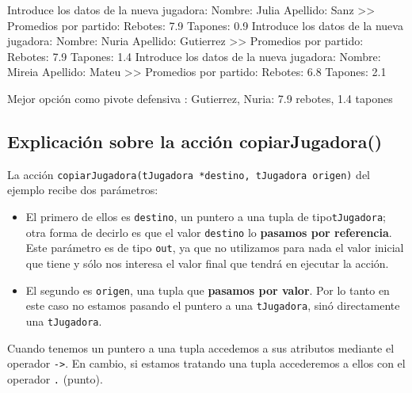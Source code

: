 \documentclass[
]{book}
\newenvironment{Shaded}{\begin{snugshade}}{\end{snugshade}}
\newcommand{\FloatTok}[1]{\textcolor[rgb]{0.00,0.00,0.81}{#1}}
\newcommand{\NormalTok}[1]{#1}
\providecommand{\tightlist}{%
  \setlength{\itemsep}{0pt}\setlength{\parskip}{0pt}}
\begin{document}
\begin{Shaded}
\begin{Highlighting}[]
\NormalTok{Introduce los datos de la nueva jugadora: }
\NormalTok{    Nombre: Julia}
\NormalTok{    Apellido: Sanz}
\NormalTok{    \textgreater{}\textgreater{} Promedios por partido:}
\NormalTok{    Rebotes: }\FloatTok{7.9}
\NormalTok{    Tapones: }\FloatTok{0.9}
\NormalTok{Introduce los datos de la nueva jugadora: }
\NormalTok{    Nombre: Nuria}
\NormalTok{    Apellido: Gutierrez}
\NormalTok{    \textgreater{}\textgreater{} Promedios por partido:}
\NormalTok{    Rebotes: }\FloatTok{7.9}
\NormalTok{    Tapones: }\FloatTok{1.4}
\NormalTok{Introduce los datos de la nueva jugadora: }
\NormalTok{    Nombre: Mireia}
\NormalTok{    Apellido: Mateu}
\NormalTok{    \textgreater{}\textgreater{} Promedios por partido:}
\NormalTok{    Rebotes: }\FloatTok{6.8}
\NormalTok{    Tapones: }\FloatTok{2.1}

\NormalTok{Mejor opción como pivote defensiva : }
\NormalTok{Gutierrez, Nuria: }\FloatTok{7.9}\NormalTok{ rebotes, }\FloatTok{1.4}\NormalTok{ tapones }
\end{Highlighting}
\end{Shaded}

\hypertarget{explicaciuxf3n-sobre-la-acciuxf3n-copiarjugadora}{%
\subsection{Explicación sobre la acción copiarJugadora()}\label{explicaciuxf3n-sobre-la-acciuxf3n-copiarjugadora}}

La acción \texttt{copiarJugadora(tJugadora\ *destino,\ tJugadora\ origen)} del ejemplo recibe dos parámetros:

\begin{itemize}
\tightlist
\item
  El primero de ellos es \texttt{destino}, un puntero a una tupla de tipo\texttt{tJugadora}; otra forma de decirlo es que el valor \texttt{destino} lo \textbf{pasamos por referencia}. Este parámetro es de tipo \texttt{out}, ya que no utilizamos para nada el valor inicial que tiene y sólo nos interesa el valor final que tendrá en ejecutar la acción.
\item
  El segundo es \texttt{origen}, una tupla que \textbf{pasamos por valor}. Por lo tanto en este caso no estamos pasando el puntero a una \texttt{tJugadora}, sinó directamente una \texttt{tJugadora}.
\end{itemize}

Cuando tenemos un puntero a una tupla accedemos a sus atributos mediante el operador \texttt{-\textgreater{}}. En cambio, si estamos tratando una tupla accederemos a ellos con el operador \texttt{.} (punto).
\end{document}

